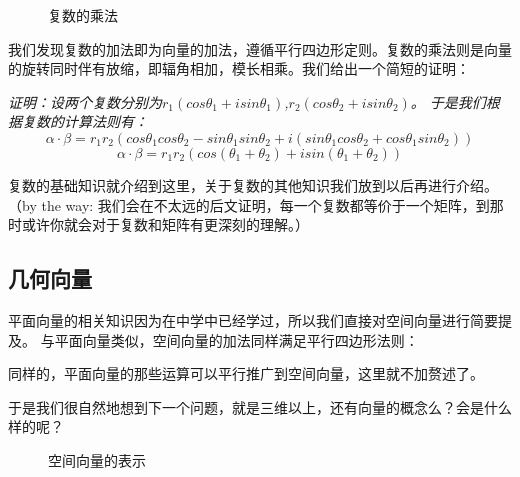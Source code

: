 \documentclass[a4paper]{ctexart}
\begin{document}
\begin{figure}[htp]
\centering
{}
\caption{复数的乘法}
\end{figure}

我们发现复数的加法即为向量的加法，遵循平行四边形定则。复数的乘法则是向量的旋转同时伴有放缩，即辐角相加，模长相乘。我们给出一个简短的证明：

\textit{
证明：设两个复数分别为$r_1(cos\theta_1+isin\theta_1)$,$r_2(cos\theta_2+isin\theta_2)$。
于是我们根据复数的计算法则有：}
$$
\alpha \cdot \beta = r_1 r_2 (cos\theta_1 cos\theta_2 -sin\theta_1 sin\theta_2 +i(sin\theta_1 cos\theta_2 +cos\theta_1 sin\theta_2))
$$
$$
\alpha \cdot \beta = r_1 r_2(cos(\theta_1+\theta_2)+isin(\theta_1+\theta_2))
$$

复数的基础知识就介绍到这里，关于复数的其他知识我们放到以后再进行介绍。（by the way: 我们会在不太远的后文证明，每一个复数都等价于一个矩阵，到那时或许你就会对于复数和矩阵有更深刻的理解。）

\subsection{几何向量}
平面向量的相关知识因为在中学中已经学过，所以我们直接对空间向量进行简要提及。
与平面向量类似，空间向量的加法同样满足平行四边形法则：

同样的，平面向量的那些运算可以平行推广到空间向量，这里就不加赘述了。

于是我们很自然地想到下一个问题，就是三维以上，还有向量的概念么？会是什么样的呢？

\begin{figure}[htp]
\centering
{}
\caption{空间向量的表示}
\end{figure}
\end{document}
